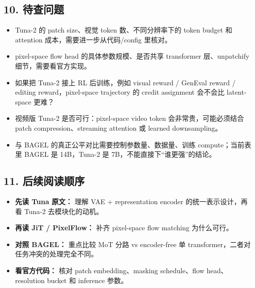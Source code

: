 \subsection{10. 待查问题}

\begin{itemize}[leftmargin=1.5em]
  \item Tuna-2 的 patch size、视觉 token 数、不同分辨率下的 token budget 和 attention 成本，需要进一步从代码/config 里核对。
  \item pixel-space flow head 的具体参数规模、是否共享 transformer 层、unpatchify 细节，需要看官方实现。
  \item 如果把 Tuna-2 接上 RL 后训练，例如 visual reward / GenEval reward / editing reward，pixel-space trajectory 的 credit assignment 会不会比 latent-space 更难？
  \item 视频版 Tuna-2 是否可行：pixel-space video token 会非常贵，可能必须结合 patch compression、streaming attention 或 learned downsampling。
  \item 与 BAGEL 的真正公平对比需要控制参数量、数据量、训练 compute；当前表里 BAGEL 是 14B，Tuna-2 是 7B，不能直接下“谁更强”的结论。
\end{itemize}

\subsection{11. 后续阅读顺序}

\begin{itemize}[leftmargin=1.5em]
  \item \textbf{先读 Tuna 原文：} 理解 VAE + representation encoder 的统一表示设计，再看 Tuna-2 去模块化的动机。
  \item \textbf{再读 JiT / PixelFlow：} 补齐 pixel-space flow matching 为什么可行。
  \item \textbf{对照 BAGEL：} 重点比较 MoT 分路 vs encoder-free 单 transformer，二者对任务冲突的处理完全不同。
  \item \textbf{看官方代码：} 核对 patch embedding、masking schedule、flow head、resolution bucket 和 inference 参数。
\end{itemize}
